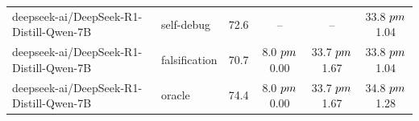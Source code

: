 \begin{tabular}{llcccc}
deepseek-ai/DeepSeek-R1-Distill-Qwen-7B & self-debug & 72.6 & -- & -- & 33.8 $\\pm$ 1.04 \\
deepseek-ai/DeepSeek-R1-Distill-Qwen-7B & falsification & 70.7 & 8.0 $\\pm$ 0.00 & 33.7 $\\pm$ 1.67 & 33.8 $\\pm$ 1.04 \\
deepseek-ai/DeepSeek-R1-Distill-Qwen-7B & oracle & 74.4 & 8.0 $\\pm$ 0.00 & 33.7 $\\pm$ 1.67 & 34.8 $\\pm$ 1.28 \\
\bottomrule
\end{tabular}
